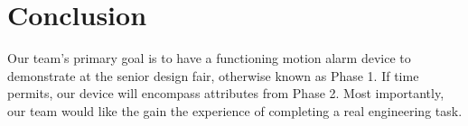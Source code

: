 \section{Conclusion}
Our team's primary goal is to have a functioning motion alarm device to demonstrate at the senior design fair, otherwise known as Phase 1. If time permits, our device will encompass attributes from Phase 2. Most importantly, our team would like the gain the experience of completing a real engineering task.  